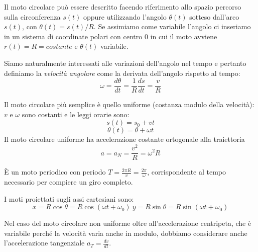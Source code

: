 \documentclass[class=book, crop=false, oneside, 12pt]{standalone}
\begin{document}
Il moto circolare può essere descritto facendo riferimento allo spazio percorso sulla circonferenza \(s(t)\) oppure 
utilizzando l'angolo \(\theta (t)\) sotteso dall'arco \(s(t)\), con \(\theta(t) = s(t)/R\).
Se assimiamo come variabile l'angolo ci inseriamo in un sistema di coordinate polari con centro \(0\) in cui il moto avviene \(r(t) = R = costante\) e \(\theta(t)\) variabile.

Siamo naturalmente interessati alle variazioni dell'angolo nel tempo e pertanto definiamo la \emph{velocità angolare} come la derivata dell'angolo rispetto al tempo:
\begin{equation}
  \omega = \frac{d \theta}{dt} = \frac{1}{R} \frac {ds} {dt} = \frac{v}{R}
\end{equation}

Il moto circolare più semplice è quello uniforme (costanza modulo della velocità): \(v\) e \(\omega\) sono costanti e le leggi orarie sono:
\begin{equation}
  s(t) = s_0 + vt
\end{equation}
\begin{equation}
  \theta(t) = \theta + \omega t
\end{equation}
Il moto circolare uniforme ha accelerazione costante ortogonale alla traiettoria
\begin{equation}
  a = a_N = \frac{v^2}{R} = \omega^2 R
\end{equation}

È un moto periodico con periodo \(T = \frac{2 \pi R}{v} = \frac{2 \pi}{\omega}\), corrispondente al tempo necessario per compiere un giro completo.

I moti proiettati sugli assi cartesiani sono:
\begin{equation}
  x = R \cos \theta = R \cos (\omega t + \omega_0) \
  y = R \sin \theta = R \sin (\omega t + \omega_0)
\end{equation}

Nel caso del moto circolare non uniforme oltre all'accelerazione centripeta, che è variabile perché la velocità varia anche in modulo, dobbiamo considerare anche l'accelerazione tangenziale \(a_T = \frac{dv}{dt} \).
\end{document}
